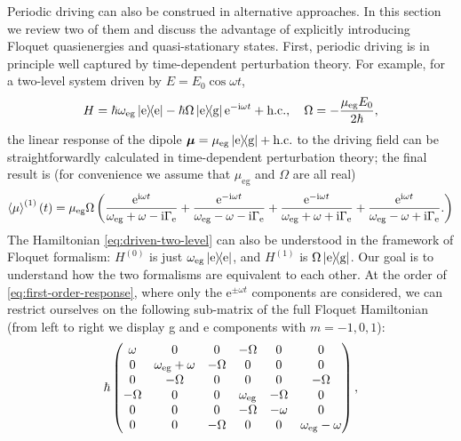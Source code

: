 \documentclass[hyperref, a4paper]{article}
\newcommand*{\ii}{\mathrm{i}}
\newcommand*{\ee}{\mathrm{e}}
\newcommand*{\Gammae}{\Gamma_{\text{e}}}
\newcommand*{\omegaeg}{\omega_{\text{eg}}}
\newcommand*{\mueg}{\mu_{\text{eg}}}
\begin{document}
Periodic driving can also be construed in alternative approaches.
In this section we review two of them and discuss the advantage 
of explicitly introducing Floquet quasienergies and quasi-stationary states.
First, periodic driving is in principle well captured by time-dependent perturbation theory.
For example, for a two-level system driven by $E = E_0 \cos \omega t$,
\begin{equation}
    H = \hbar \omegaeg \dyad{\text{e}} - \hbar \Omega \dyad*{\text{e}}{\text{g}} \ee^{- \ii \omega t} + \text{h.c.}, 
    \quad \Omega = - \frac{\mueg E_0}{2 \hbar}, 
    \label{eq:driven-two-level}
\end{equation}
the linear response of the dipole 
$\vb*{\mu} = \mueg \dyad*{\text{e}}{\text{g}} + \text{h.c.}$
to the driving field can be straightforwardly calculated 
in time-dependent perturbation theory; the final result is 
(for convenience we assume that $\mueg$ and $\Omega$ are all real)
\begin{equation}
    \expval{\mu}^{(1)}(t) = \mueg \Omega \left(
        \frac{\ee^{\ii \omega t}}{\omegaeg + \omega - \ii \Gammae}
        + \frac{\ee^{- \ii \omega t}}{\omegaeg - \omega - \ii \Gammae}
        + \frac{\ee^{- \ii \omega t}}{\omegaeg + \omega + \ii \Gammae}
        + \frac{\ee^{\ii \omega t}}{\omegaeg - \omega + \ii \Gammae}.
    \right)
    \label{eq:first-order-response}
\end{equation}
The Hamiltonian \eqref{eq:driven-two-level} can also be understood in the framework of Floquet formalism:
$H^{(0)}$ is just $\omegaeg \dyad{\text{e}}$,
and $H^{(1)}$ is $\Omega \dyad*{\text{e}}{\text{g}}$.
Our goal is to understand how the two formalisms are equivalent to each other.
At the order of \eqref{eq:first-order-response}, 
where only the $\ee^{\pm \omega t}$ components are considered,
we can restrict ourselves on the following sub-matrix of the full Floquet Hamiltonian
(from left to right we display g and e components with $m = -1, 0, 1$):
\begin{equation}
    \hbar \pmqty{
        \omega  & 0                  & 0        &-\Omega   & 0        & 0                \\
        0       & \omegaeg + \omega  &-\Omega   & 0        & 0        & 0                \\
        0       &-\Omega             & 0        & 0        & 0        &-\Omega           \\
       -\Omega  & 0                  & 0        & \omegaeg &-\Omega   & 0                \\
        0       & 0                  & 0        &-\Omega   & - \omega & 0                \\
        0       & 0                  &-\Omega   & 0        & 0        & \omegaeg - \omega\\
    },
    \label{eq:floquet-matrix}
\end{equation}
\end{document}
